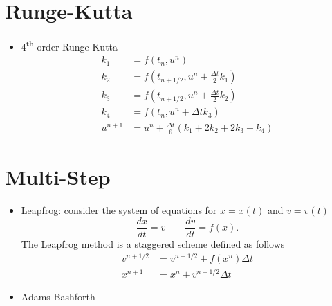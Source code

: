\documentclass[oneside,a4paper,11pt]{report}
\begin{document}
\section{Runge-Kutta}
\begin{itemize}
\item 4\textsuperscript{th} order Runge-Kutta
\begin{align}
k_1 &= f(t_n, u^n) \nonumber \\
k_2 & = f(t_{n+1/2}, u^n + \frac{\Delta t}{2} k_1) \nonumber \\
k_3 & = f(t_{n+1/2}, u^n + \frac{\Delta t}{2} k_2) \nonumber \\
k_4 & = f(t_n, u^n + \Delta t k_3) \nonumber \\
u^{n+1} &= u^n + \frac{\Delta t}{6} (k_1 + 2k_2 + 2k_3 + k_4)
\end{align}
\end{itemize}

\section{Multi-Step}
\begin{itemize}
\item Leapfrog: consider the system of equations for $x=x(t)$ and $v=v(t)$
\begin{equation}
    \frac{dx}{dt} = v \qquad \frac{dv}{dt} = f(x).
\end{equation}
The Leapfrog method is a staggered scheme defined as follows
\begin{align}
    v^{n+1/2} &= v^{n-1/2} + f(x^n) \Delta t \\
    x^{n+1} &= x^{n} + v^{n+1/2} \Delta t
\end{align}

\item Adams-Bashforth
\end{itemize}

\end{document}
